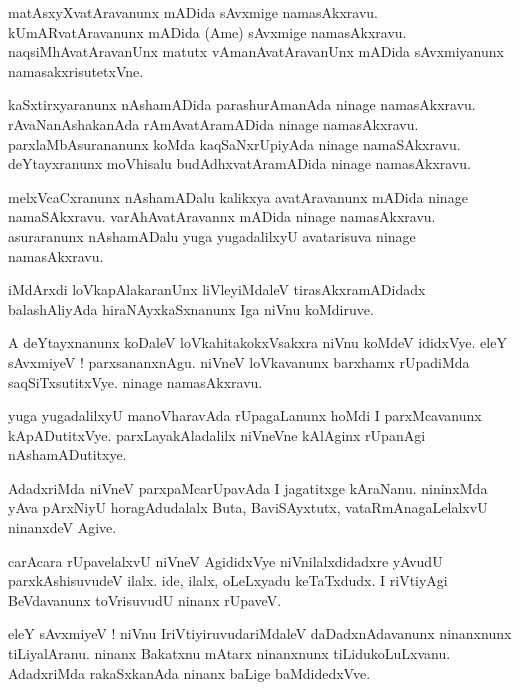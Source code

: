 \documentclass{article}
\begin{document}
\begin{mng}%
matAsxyXvatAravanunx mADida sAvxmige namasAkxravu. kUmARvatAravanunx mADida (Ame) sAvxmige 
namasAkxravu. naqsiMhAvatAravanUnx matutx vAmanAvatAravanUnx mADida sAvxmiyanunx 
namasakxrisutetxVne.
\end{mng}

\begin{mng}%
kaSxtirxyaranunx nAshamADida parashurAmanAda ninage namasAkxravu. rAvaNanAshakanAda 
rAmAvatAramADida ninage namasAkxravu. parxlaMbAsurananunx koMda kaqSaNxrUpiyAda ninage 
namaSAkxravu. deYtayxranunx moVhisalu budAdhxvatAramADida ninage namasAkxravu.
\end{mng}

\begin{mng}%
melxVcaCxranunx nAshamADalu kalikxya avatAravanunx mADida ninage namaSAkxravu. varAhAvatAravannx 
mADida ninage namasAkxravu. asuraranunx nAshamADalu yuga yugadalilxyU avatarisuva ninage 
namasAkxravu.
\end{mng}

\begin{mng}%
iMdArxdi loVkapAlakaranUnx liVleyiMdaleV tirasAkxramADidadx balashAliyAda hiraNAyxkaSxnanunx Iga 
niVnu koMdiruve.
\end{mng}

\begin{mng}%
A deYtayxnanunx koDaleV loVkahitakokxVsakxra niVnu koMdeV ididxVye. eleY sAvxmiyeV ! 
parxsananxnAgu. niVneV loVkavanunx barxhamx rUpadiMda saqSiTxsutitxVye. ninage namasAkxravu.
\end{mng}

\begin{mng}%
yuga yugadalilxyU manoVharavAda rUpagaLanunx hoMdi I parxMcavanunx kApADutitxVye. 
parxLayakAladalilx niVneVne kAlAginx rUpanAgi nAshamADutitxye.
\end{mng}

\begin{mng}%
AdadxriMda niVneV parxpaMcarUpavAda I jagatitxge kAraNanu. nininxMda yAva pArxNiyU horagAdudalalx 
Buta, BaviSAyxtutx, vataRmAnagaLelalxvU ninanxdeV Agive.
\end{mng}

\begin{mng}%
carAcara rUpavelalxvU niVneV AgididxVye niVnilalxdidadxre yAvudU parxkAshisuvudeV ilalx. ide, 
ilalx, oLeLxyadu keTaTxdudx. I riVtiyAgi BeVdavanunx toVrisuvudU ninanx rUpaveV.
\end{mng}

\begin{mng}%
eleY sAvxmiyeV ! niVnu IriVtiyiruvudariMdaleV daDadxnAdavanunx ninanxnunx tiLiyalAranu. ninanx 
Bakatxnu mAtarx ninanxnunx tiLidukoLuLxvanu. AdadxriMda rakaSxkanAda ninanx baLige baMdidedxVve.
\end{mng}
\end{document}
